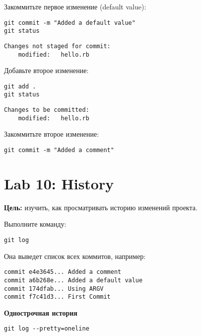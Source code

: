 \documentclass[a4paper,12pt]{report}
\begin{document}

Закоммитьте первое изменение (default value):
\begin{verbatim}
git commit -m "Added a default value"
git status
\end{verbatim}

\begin{verbatim}
Changes not staged for commit:
	modified:   hello.rb
\end{verbatim}

Добавьте второе изменение:
\begin{verbatim}
git add .
git status
\end{verbatim}

\begin{verbatim}
Changes to be committed:
	modified:   hello.rb
\end{verbatim}

Закоммитьте второе изменение:
\begin{verbatim}
git commit -m "Added a comment"
\end{verbatim}


\section{Lab 10: History}
\textbf{Цель:} изучить, как просматривать историю изменений проекта.

Выполните команду:
\begin{verbatim}
git log
\end{verbatim}

Она выведет список всех коммитов, например:
\begin{verbatim}
commit e4e3645... Added a comment
commit a6b268e... Added a default value
commit 174dfab... Using ARGV
commit f7c41d3... First Commit
\end{verbatim}


\textbf{Однострочная история}
\begin{verbatim}
git log --pretty=oneline
\end{verbatim}
\end{document}
